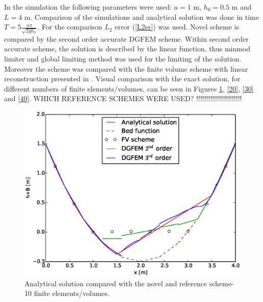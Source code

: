  In the simulation the following parameters were used: $a=1$ m, $h_0=0.5$ m and $L=4$ m. Comparison of the simulations and analytical solution was done in time  $T=5\frac{a\pi}{\sqrt{2gh_0}}$. For the comparison $L_2$ error (\ref{L2er}) was used. Novel scheme is compared by the second order accurate DGFEM scheme. Within second order accurate scheme, the solution is described by the linear function, thus minmod limiter and global limiting method was used for the limiting of the solution. Moreover the scheme was compared with the finite volume scheme with linear reconstruction presented in \cite{fiser2016}. Visual comparison with the exact solution, for different numbers of finite elements/volumes, can be seen in Figures \ref{10}, \ref{20}, \ref{30} and \ref{40}.  WHICH REFERENCE SCHEMES WERE USED? !!!!!!!!!!!!!!!!!!!!!!!
				\begin{figure}[!ht]
								\centering
								 \begin{minipage}[t]{0.44\textwidth}
								    \begin{center}
								    \includegraphics[width=1.0\textwidth]{OBR/10.eps}
								    \caption{Analytical solution compared with the novel and reference scheme-10 finite elements/volumes.}\label{10}
								    \end{center}
								\end{minipage}\hspace{15mm}
								\begin{minipage}[t]{0.44\textwidth}
								    \begin{center}

\end{center}
\end{minipage}
\end{figure}
